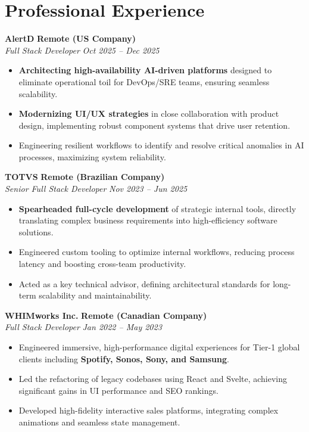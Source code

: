 \documentclass[a4paper,10pt]{article}
\newcommand{\experience}[4]{
    \noindent
    \textbf{\large #1} \hfill \textbf{#2} \\
    \textit{\color{darkgray} #3} \hfill \textit{#4}
    \vspace{2pt}
}
\begin{document}
\section{Professional Experience}

\experience{AlertD}{Remote (US Company)}{Full Stack Developer}{Oct 2025 -- Dec 2025}
\begin{itemize}[leftmargin=*, noitemsep, topsep=2pt]
    \item \textbf{Architecting high-availability AI-driven platforms} designed to eliminate operational toil for DevOps/SRE teams, ensuring seamless scalability.
    \item \textbf{Modernizing UI/UX strategies} in close collaboration with product design, implementing robust component systems that drive user retention.
    \item Engineering resilient workflows to identify and resolve critical anomalies in AI processes, maximizing system reliability.
\end{itemize}

\vspace{0.3cm}

\experience{TOTVS}{Remote (Brazilian Company)}{Senior Full Stack Developer}{Nov 2023 -- Jun 2025}
\begin{itemize}[leftmargin=*, noitemsep, topsep=2pt]
    \item \textbf{Spearheaded full-cycle development} of strategic internal tools, directly translating complex business requirements into high-efficiency software solutions.
    \item Engineered custom tooling to optimize internal workflows, reducing process latency and boosting cross-team productivity.
    \item Acted as a key technical advisor, defining architectural standards for long-term scalability and maintainability.
\end{itemize}

\vspace{0.3cm}

\experience{WHIMworks Inc.}{Remote (Canadian Company)}{Full Stack Developer}{Jan 2022 -- May 2023}
\begin{itemize}[leftmargin=*, noitemsep, topsep=2pt]
    \item Engineered immersive, high-performance digital experiences for Tier-1 global clients including \textbf{Spotify, Sonos, Sony, and Samsung}.
    \item Led the refactoring of legacy codebases using React and Svelte, achieving significant gains in UI performance and SEO rankings.
    \item Developed high-fidelity interactive sales platforms, integrating complex animations and seamless state management.
\end{itemize}
\end{document}
